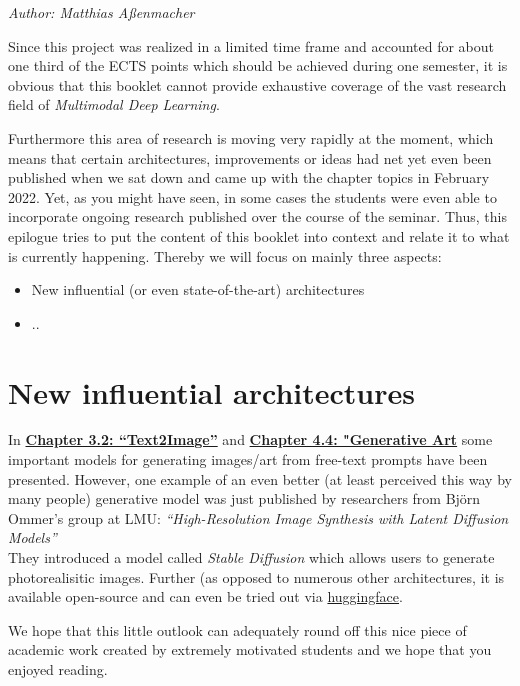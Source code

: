 \documentclass[
]{krantz}
\providecommand{\tightlist}{%
  \setlength{\itemsep}{0pt}\setlength{\parskip}{0pt}}
\begin{document}
\emph{Author: Matthias Aßenmacher}

Since this project was realized in a limited time frame and accounted for about one third
of the ECTS points which should be achieved during one semester, it is obvious that this
booklet cannot provide exhaustive coverage of the vast research field of \emph{Multimodal Deep Learning}.

Furthermore this area of research is moving very rapidly at the moment, which means that
certain architectures, improvements or ideas had net yet even been published when we sat down
and came up with the chapter topics in February 2022. Yet, as you might have seen, in some cases the
students were even able to incorporate ongoing research published over the course of the seminar.
Thus, this epilogue tries to put the content of this booklet into context and relate it to what is
currently happening. Thereby we will focus on mainly three aspects:

\begin{itemize}
\tightlist
\item
  New influential (or even state-of-the-art) architectures
\item
  ..
\end{itemize}

\hypertarget{new-influential-architectures}{%
\section{New influential architectures}\label{new-influential-architectures}}

In \href{./02-02-text2img.html}{\textbf{Chapter 3.2: ``Text2Image''}} and \href{./03-04-usecase.html}{\textbf{Chapter 4.4: "Generative Art}} some important models for generating images/art from free-text prompts have been presented. However, one example of an even better (at least perceived this way by many people) generative model was just published by researchers from Björn Ommer's group at LMU: \emph{``High-Resolution Image Synthesis with Latent Diffusion Models''}\\
They introduced a model called \emph{Stable Diffusion} which allows users to generate photorealisitic images. Further (as opposed to numerous other architectures, it is available open-source and can even be tried out via \href{https://huggingface.co/spaces/stabilityai/stable-diffusion}{huggingface}.

We hope that this little outlook can adequately round off this nice piece of academic work created by extremely motivated students and we hope that you enjoyed reading.
\end{document}
